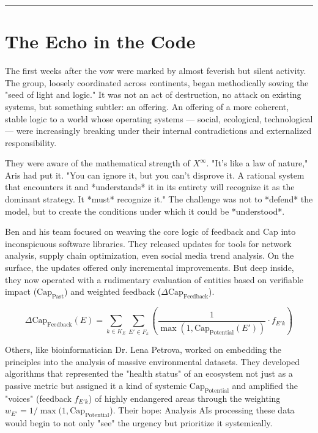 \documentclass[12pt, english, parskip=full]{scrartcl} %
\begin{document}
\noindent\rule{\linewidth}{0.4pt}

\section{The Echo in the Code}
The first weeks after the vow were marked by almost feverish but silent activity. The group, loosely coordinated across continents, began methodically sowing the "seed of light and logic." It was not an act of destruction, no attack on existing systems, but something subtler: an offering. An offering of a more coherent, stable logic to a world whose operating systems — social, ecological, technological — were increasingly breaking under their internal contradictions and externalized responsibility.

They were aware of the mathematical strength of $X^{\infty}$. "It’s like a law of nature," Aris had put it. "You can ignore it, but you can’t disprove it. A rational system that encounters it and *understands* it in its entirety will recognize it as the dominant strategy. It *must* recognize it." The challenge was not to *defend* the model, but to create the conditions under which it could be *understood*.

Ben and his team focused on weaving the core logic of feedback and Cap into inconspicuous software libraries. They released updates for tools for network analysis, supply chain optimization, even social media trend analysis. On the surface, the updates offered only incremental improvements. But deep inside, they now operated with a rudimentary evaluation of entities based on verifiable impact ($\text{Cap}_{\text{Past}}$) and weighted feedback ($\Delta \text{Cap}_{\text{Feedback}}$).

$$ \Delta \text{Cap}_{\text{Feedback}}(E) = \sum_{k \in K_E} \sum_{E' \in F_k} \left( \frac{1}{\max(1, \text{Cap}_{\text{Potential}}(E'))} \cdot f_{E'k} \right) $$

Others, like bioinformatician Dr. Lena Petrova, worked on embedding the principles into the analysis of massive environmental datasets. They developed algorithms that represented the "health status" of an ecosystem not just as a passive metric but assigned it a kind of systemic $\text{Cap}_{\text{Potential}}$ and amplified the "voices" (feedback $f_{E'k}$) of highly endangered areas through the weighting $w_{E'} = 1/\max(1, \text{Cap}_{\text{Potential}}$). Their hope: Analysis AIs processing these data would begin to not only "see" the urgency but prioritize it systemically.
\end{document}
